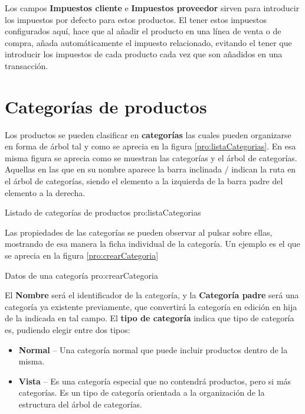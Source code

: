 Los campos \textbf{Impuestos cliente} e \textbf{Impuestos proveedor} sirven para introducir los impuestos por defecto para estos productos. El tener estos impuestos configurados aquí, hace que al añadir el producto en una línea de venta o de compra, añada automáticamente el impuesto relacionado, evitando el tener que introducir los impuestos de cada producto cada vez que son añadidos en una transacción.





\section{Categorías de productos}
\label{pro:categorias}

Los productos se pueden clasificar en \textbf{categorías} las cuales pueden organizarse en forma de árbol tal y como se aprecia en la figura \ref{pro:listaCategorias}. En esa misma figura se aprecia como se muestran las categorías y el árbol de categorías. Aquellas en las que en su nombre aparece la barra inclinada $/$ indican la ruta en el árbol de categorías, siendo el elemento a la izquierda de la barra padre del elemento a la derecha.

{Listado de categorías de productos}
{pro:listaCategorias}

Las propiedades de las categorías se pueden observar al pulsar sobre ellas, mostrando de esa manera la ficha individual de la categoría. Un ejemplo es el que se aprecia en la figura \ref{pro:crearCategoria}

{Datos de una categoría}
{pro:crearCategoria}


El \textbf{Nombre} será el identificador de la categoría, y la \textbf{Categoría padre} será una categoría ya existente previamente, que convertirá la categoría en edición en hija de la indicada en tal campo. El \textbf{tipo de categoría} indica que tipo de categoría es, pudiendo elegir entre dos tipos:

\begin{itemize}
  \item \textbf{Normal} -- Una categoría normal que puede incluir productos dentro de la misma.
  \item \textbf{Vista} -- Es una categoría especial que no contendrá productos, pero si más categorías. Es un tipo de categoría orientada a la organización de la estructura del árbol de categorías.
\end{itemize}

